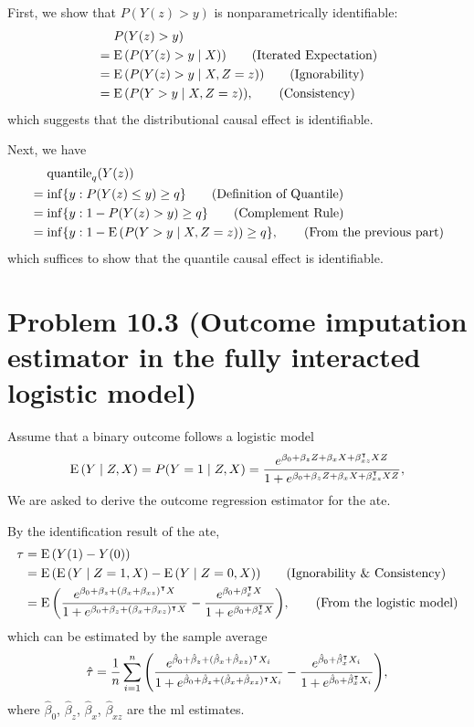 \documentclass[10pt]{article}
\begin{document}
First, we show that $P(Y(z) > y)$
is nonparametrically identifiable:
\begin{align*}
  &\mathrel{\phantom{=}} P{\left( Y(z) > y \right)} \\
  &= \operatorname{E}{\left( P{\left( Y(z) > y \mid X \right)} \right)} \tag{Iterated Expectation} \\
  &= \operatorname{E}{\left( P{\left( Y(z) > y \mid X, Z = z \right)} \right)} \tag{Ignorability} \\
  &= \operatorname{E}{\left( P{\left( Y > y \mid X, Z = z \right)} \right)}, \tag{Consistency} \\
\end{align*}
which suggests that the distributional causal effect is identifiable.

Next, we have
\begin{align*}
  &\mathrel{\phantom{=}} \operatorname{quantile}_q(Y(z)) \\
  &= \inf\{y: P(Y(z) \leq y) \geq q\} \tag{Definition of Quantile} \\
  &= \inf\{y: 1 - P(Y(z) > y) \geq q\} \tag{Complement Rule} \\
  &= \inf\{y: 1 - \operatorname{E}{\left( P{\left( Y > y \mid X, Z = z \right)} \right)} \geq q\}, \tag{From the previous part}
\end{align*}
which suffices to show that the quantile causal effect is identifiable.

\section*{Problem 10.3 (Outcome imputation estimator in the fully interacted logistic model)}

Assume that a binary outcome follows a logistic model
\begin{align*}
  \operatorname{E}{\left( Y \mid Z, X \right)} 
  = P(Y = 1 \mid Z, X)
  = \frac{e^{\beta_0 + \beta_z Z + \beta_x X + \beta_{xz}^\intercal XZ}}{1 + e^{\beta_0 + \beta_z Z + \beta_x X + \beta_{xz}^\intercal XZ}},
\end{align*}
We are asked to derive the outcome regression estimator
for the \gls{ate}.

By the identification result of the \gls{ate},
\begin{align*}
  \tau 
  &= \operatorname{E}{\left( Y(1) - Y(0) \right)} \\
  &= \operatorname{E}{\left( \operatorname{E}{\left( Y \mid Z = 1, X \right)} - \operatorname{E}{\left( Y \mid Z = 0, X \right)} \right)} \tag{Ignorability \& Consistency} \\
  &= \operatorname{E}{\left( \frac{e^{\beta_0 + \beta_z + (\beta_x + \beta_{xz})^\intercal X}}{1 + e^{\beta_0 + \beta_z + (\beta_x + \beta_{xz})^\intercal X}} 
    - \frac{e^{\beta_0 + \beta_x^\intercal X}}{1 + e^{\beta_0 + \beta_x^\intercal X}} \right)}, \tag{From the logistic model}
\end{align*}
which can be estimated by the sample average
\begin{align*}
  \hat{\tau} 
  = \frac{1}{n} \sum_{i=1}^n {\left( \frac{e^{\hat{\beta}_0 + \hat{\beta}_z + (\hat{\beta}_x + \hat{\beta}_{xz})^\intercal X_i}}{1 + e^{\hat{\beta}_0 + \hat{\beta}_z + (\hat{\beta}_x + \hat{\beta}_{xz})^\intercal X_i}} 
    - \frac{e^{\hat{\beta}_0 + \hat{\beta}_x^\intercal X_i}}{1 + e^{\hat{\beta}_0 + \hat{\beta}_x^\intercal X_i}} \right)},
\end{align*}
where $\hat{\beta}_0$, $\hat{\beta}_z$, $\hat{\beta}_x$, $\hat{\beta}_{xz}$ 
are the \gls{ml} estimates.
\end{document}
